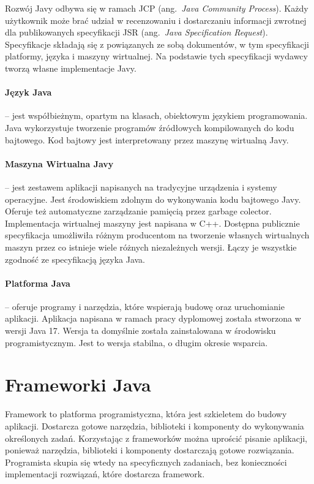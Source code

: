 Rozwój Javy odbywa się w ramach JCP (ang.~\emph{Java Community Process}). Każdy użytkownik może brać udział w recenzowaniu i dostarczaniu informacji zwrotnej dla publikowanych specyfikacji JSR (ang.~\emph{Java Specification Request}). Specyfikacje składają się z powiązanych ze sobą dokumentów, w tym specyfikacji platformy, języka i  maszyny wirtualnej. Na podstawie tych specyfikacji wydawcy tworzą własne implementacje Javy.

\paragraph{Język Java} -- jest współbieżnym, opartym na klasach, obiektowym językiem programowania. Java wykorzystuje tworzenie programów źródłowych kompilowanych do kodu bajtowego. Kod bajtowy jest interpretowany przez maszynę wirtualną Javy.

\paragraph{Maszyna Wirtualna Javy} -- jest zestawem aplikacji napisanych na tradycyjne urządzenia i systemy operacyjne. Jest środowiskiem  zdolnym do wykonywania kodu bajtowego Javy. Oferuje też automatyczne zarządzanie pamięcią przez garbage colector. Implementacja wirtualnej maszyny jest napisana w C++. Dostępna publicznie specyfikacja umożliwiła różnym producentom na tworzenie własnych wirtualnych maszyn przez co istnieje wiele różnych niezależnych wersji. Łączy je wszystkie zgodność ze specyfikacją języka Java.

\paragraph{Platforma Java} -- oferuje programy i narzędzia, które wspierają budowę oraz uruchomianie aplikacji. Aplikacja napisana w ramach pracy dyplomowej została stworzona w wersji Java 17. Wersja ta domyślnie została zainstalowana w środowisku programistycznym. Jest to wersja stabilna, o długim okresie wsparcia.

\section{Frameworki Java}
Framework to platforma programistyczna, która jest szkieletem do budowy aplikacji. Dostarcza gotowe narzędzia, biblioteki i komponenty do wykonywania określonych zadań. Korzystając z frameworków można uprościć pisanie aplikacji, ponieważ narzędzia, biblioteki i komponenty dostarczają gotowe rozwiązania. Programista skupia się wtedy na specyficznych zadaniach, bez konieczności implementacji rozwiązań, które dostarcza framework. 

